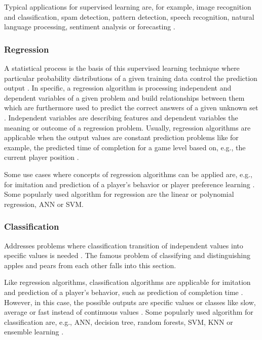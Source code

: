 \documentclass[MGS,Master,english]{twbook}%
\begin{document}
Typical applications for supervised learning are, for example, image recognition and classification, spam detection, pattern detection, speech recognition, natural language processing, sentiment analysis or forecasting \cite{ml::book::algorithms}.

\subsubsection{Regression}
A statistical process is the basis of this supervised learning technique where particular probability distributions of a given training data control the prediction output \cite{ml::book::developer}. In specific, a regression algorithm is processing independent and dependent variables of a given problem and build relationships between them which are furthermore used to predict the correct answers of a given unknown set \cite{ml::book::developer}. Independent variables are describing features and dependent variables the meaning or outcome of a regression problem. Usually, regression algorithms are applicable when the output values are constant prediction problems like for example, the predicted time of completion for a game level based on, e.g., the current player position \cite{ai::book}.

Some use cases where concepts of regression algorithms can be applied are, e.g., for imitation and prediction of a player's behavior or player preference learning \cite{ai::book}. Some popularly used algorithm for regression are the linear or polynomial regression, \ac{ANN} or \ac{SVM}. \cite{ai::book}

\subsubsection{Classification}
Addresses problems where classification transition of independent values into specific values is needed \cite{ai::book}. The famous problem of classifying and distinguishing apples and pears from each other falls into this section.

Like regression algorithms, classification algorithms are applicable for imitation and prediction of a player's behavior, such as prediction of completion time \cite{ai::book}. However, in this case, the possible outputs are specific values or classes like slow, average or fast instead of continuous values \cite{ai::book}. Some popularly used algorithm for classification are, e.g., \ac{ANN}, decision tree, random forests, \ac{SVM}, \ac{KNN} or ensemble learning \cite{ai::book}.
\end{document}
